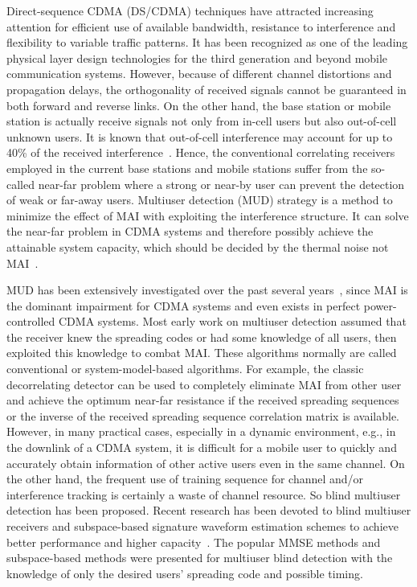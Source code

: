 \documentclass[a4paper,11pt,fleqn]{article}
\begin{document}
Direct-sequence CDMA (DS/CDMA) techniques have attracted
increasing attention for efficient use of available bandwidth,
resistance to interference and flexibility to variable traffic
patterns. It has been recognized as one of the leading physical
layer design technologies for the third generation and beyond
mobile communication systems. However, because of different
channel distortions and propagation delays, the orthogonality of
received signals cannot be guaranteed in both forward and reverse
links. On the other hand, the base station or mobile station is
actually receive signals not only from in-cell users but also
out-of-cell unknown users. It is known that out-of-cell
interference may account for up to 40\% of the received
interference~\cite{Viterbi95}. Hence, the conventional correlating
receivers employed in the current base stations and mobile
stations suffer from the so-called near-far problem where a strong
or near-by user can prevent the detection of weak or far-away
users. Multiuser detection (MUD) strategy is a method to minimize
the effect of MAI with exploiting the interference structure. It
can solve the near-far problem in CDMA systems and therefore
possibly achieve the attainable system capacity, which should be
decided by the thermal noise not MAI~\cite{Verd86}.

MUD has been extensively investigated over the past several
years~\cite{Verd98}, since MAI is the dominant impairment for CDMA
systems and even exists in perfect power-controlled CDMA systems.
Most early work on multiuser detection assumed that the receiver
knew the spreading codes or had some knowledge of all users, then
exploited this knowledge to combat MAI. These algorithms normally
are called conventional or system-model-based algorithms. For
example, the classic decorrelating detector can be used to
completely eliminate MAI from other user and achieve the optimum
near-far resistance if the received spreading sequences or the
inverse of the received spreading sequence correlation matrix is
available. However, in many practical cases, especially in a
dynamic environment, e.g., in the downlink of a CDMA system, it is
difficult for a mobile user to quickly and accurately obtain
information of other active users even in the same channel. On the
other hand, the frequent use of training sequence for channel
and/or interference tracking is certainly a waste of channel
resource. So blind multiuser detection has been proposed. Recent
research has been devoted to blind multiuser receivers and
subspace-based signature waveform estimation schemes to achieve
better performance and higher capacity~\cite{Madh94,Honi95,
Poor97, Wang98, Torl97, Liu96}. The popular MMSE methods and
subspace-based methods were presented for multiuser blind
detection with the knowledge of only the desired users' spreading
code and possible timing.
\end{document}
